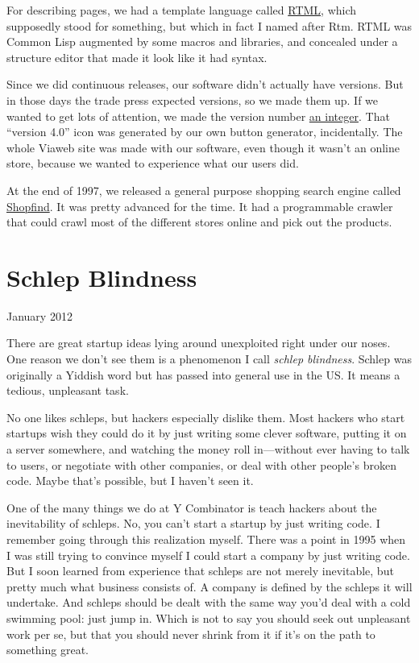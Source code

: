 \documentclass[12pt]{book}
\begin{document}
For describing pages, we had a template language called
\href{http://ycombinator.com/viaweb/rtml.html}{RTML}, which supposedly
stood for something, but which in fact I named after Rtm. RTML was
Common Lisp augmented by some macros and libraries, and concealed under
a structure editor that made it look like it had syntax.

Since we did continuous releases, our software didn't actually have
versions. But in those days the trade press expected versions, so we
made them up. If we wanted to get lots of attention, we made the version
number \href{http://www.ycombinator.com/viaweb/rel4.html}{an integer}.
That ``version 4.0'' icon was generated by our own button generator,
incidentally. The whole Viaweb site was made with our software, even
though it wasn't an online store, because we wanted to experience what
our users did.

At the end of 1997, we released a general purpose shopping search engine
called \href{http://ycombinator.com/viaweb/shoprel.html}{Shopfind}. It
was pretty advanced for the time. It had a programmable crawler that
could crawl most of the different stores online and pick out the
products.
\chapter{Schlep Blindness}

January 2012

There are great startup ideas lying around unexploited right under our
noses. One reason we don't see them is a phenomenon I call \emph{schlep
blindness}. Schlep was originally a Yiddish word but has passed into
general use in the US. It means a tedious, unpleasant task.

No one likes schleps, but hackers especially dislike them. Most hackers
who start startups wish they could do it by just writing some clever
software, putting it on a server somewhere, and watching the money roll
in---without ever having to talk to users, or negotiate with other
companies, or deal with other people's broken code. Maybe that's
possible, but I haven't seen it.

One of the many things we do at Y Combinator is teach hackers about the
inevitability of schleps. No, you can't start a startup by just writing
code. I remember going through this realization myself. There was a
point in 1995 when I was still trying to convince myself I could start a
company by just writing code. But I soon learned from experience that
schleps are not merely inevitable, but pretty much what business
consists of. A company is defined by the schleps it will undertake. And
schleps should be dealt with the same way you'd deal with a cold
swimming pool: just jump in. Which is not to say you should seek out
unpleasant work per se, but that you should never shrink from it if it's
on the path to something great.
\end{document}
